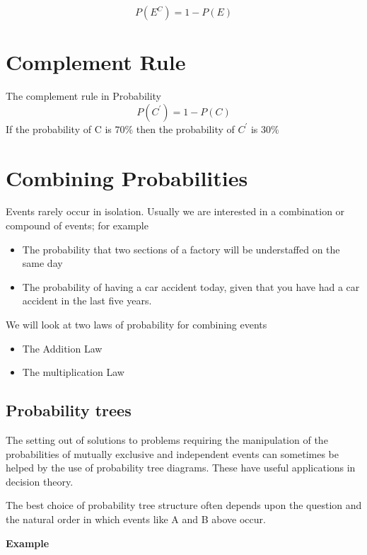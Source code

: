 \documentclass[]{report}
\begin{document}
{{{{{\begin{itemize}
\[P(E^{C}) = 1 - P(E)\]
\end{itemize}


\section{Complement Rule}
The complement rule in Probability
\[P(C^{\prime}) = 1- P(C)\]
If the probability of C is $70 \%$ then the probability of $C^{\prime}$ is $30\%$




\section{Combining Probabilities}

Events rarely occur in isolation. Usually we are interested in a combination or compound of events; for example
\begin{itemize}
\item The probability that two sections of a factory will be understaffed on the same day 
\item The probability of having a car accident today, given that you have had a car accident in the last five years.
\end{itemize}

We will look at two laws of probability for combining events
\begin{itemize}
\item The Addition Law 
\item The multiplication Law
\end{itemize}



\subsection{Probability trees}
The setting out of solutions to problems requiring the manipulation of the probabilities of mutually exclusive and independent events can sometimes be helped by the use of probability tree diagrams. These have useful applications in decision theory.

The best choice of probability tree structure often depends upon the question and the natural order in which events like A and B above occur.




\textbf{Example}\\

}}}}}
\end{document}
